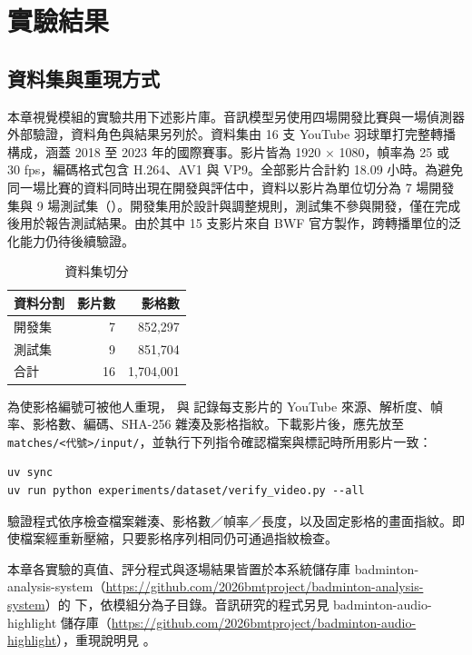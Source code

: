 \chapter{實驗結果}
\label{ch:experiments}

\section{資料集與重現方式}
\label{sec:datasets}

本章視覺模組的實驗共用下述影片庫。音訊模型另使用四場開發比賽與一場偵測器外部驗證，資料角色與結果另列於。資料集由 16 支 YouTube 羽球單打完整轉播構成，涵蓋 2018 至 2023 年的國際賽事。影片皆為 1920 $\times$ 1080，幀率為 25 或 30 fps，編碼格式包含 H.264、AV1 與 VP9。全部影片合計約 18.09 小時。為避免同一場比賽的資料同時出現在開發與評估中，資料以影片為單位切分為 7 場開發集與 9 場測試集（）。開發集用於設計與調整規則，測試集不參與開發，僅在完成後用於報告測試結果。由於其中 15 支影片來自 BWF 官方製作，跨轉播單位的泛化能力仍待後續驗證。

\begin{table}[htbp]
  \centering
  \caption{資料集切分}
  \label{tab:dataset-split}
  \begin{tabular}{|l|r|r|}
    \hline
    資料分割 & 影片數 & 影格數 \\ \hline
    開發集 & 7 & 852,297 \\ \hline
    測試集 & 9 & 851,704 \\ \hline
    合計 & 16 & 1,704,001 \\ \hline
  \end{tabular}
\end{table}

為使影格編號可被他人重現， 與  記錄每支影片的 YouTube 來源、解析度、幀率、影格數、編碼、SHA-256 雜湊及影格指紋。下載影片後，應先放至 \texttt{matches/<代號>/input/}，並執行下列指令確認檔案與標記時所用影片一致：

\begin{Verbatim}
uv sync
uv run python experiments/dataset/verify_video.py --all
\end{Verbatim}

驗證程式依序檢查檔案雜湊、影格數／幀率／長度，以及固定影格的畫面指紋。即使檔案經重新壓縮，只要影格序列相同仍可通過指紋檢查。

本章各實驗的真值、評分程式與逐場結果皆置於本系統儲存庫 badminton-analysis-system（\url{https://github.com/2026bmtproject/badminton-analysis-system}）的  下，依模組分為子目錄。音訊研究的程式另見 badminton-audio-highlight 儲存庫（\url{https://github.com/2026bmtproject/badminton-audio-highlight}），重現說明見 。


